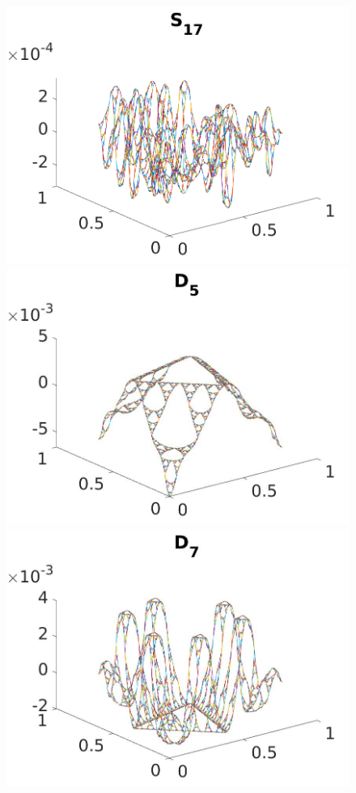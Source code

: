 \documentclass[12pt]{amsart}
\theoremstyle{plain}
\theoremstyle{definition}
\begin{document}
\begin{figure}[H]
\begin{minipage}{.3\textwidth}
    \includegraphics[width=\textwidth]{images/H1AntisymOPs0_23/SAntiSym17.png}
    \end{minipage}
    \begin{minipage}{.3\textwidth}
    \centering
    \includegraphics[width=\textwidth]{images/H1SymmOPs0_19/Ss5.jpg}
    \end{minipage}
    \begin{minipage}{.3\textwidth}
    \centering
    \includegraphics[width=\textwidth]{images/H1SymmOPs0_19/Ss7.jpg}

\end{minipage}
\end{figure}
\end{document}
